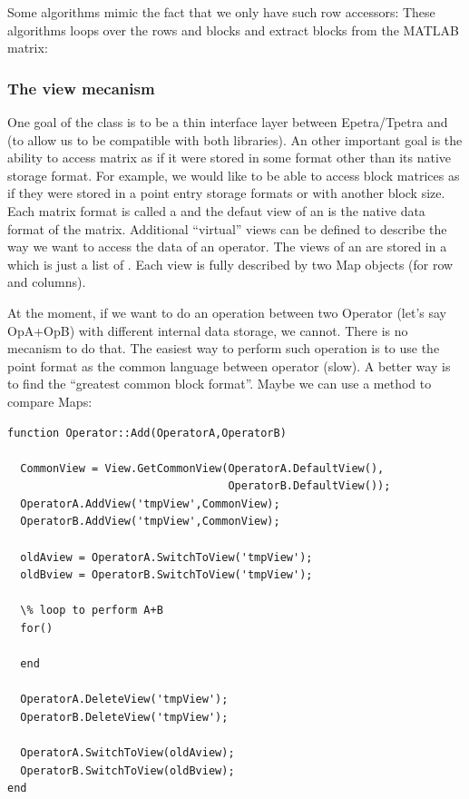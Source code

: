 Some \muemat algorithms mimic the fact that we only have such row accessors: These algorithms loops over the rows and blocks and extract blocks from the MATLAB matrix:

\subsubsection{The view mecanism}

One goal of the \Operator class is to be a thin interface layer between Epetra/Tpetra and \mloo (to allow us to be compatible with both libraries).
An other important goal is the ability to access matrix as if it were stored in some format other than its native storage format.
For example, we would like to be able to access block matrices as if they were stored in a point entry storage formats or with another block size. 
Each matrix format is called a \View and the defaut view of an \Operator is the native data format of the matrix. Additional ``virtual'' views can be defined to
describe the way we want to access the data of an operator.
The views of an \Operator are stored in a \ViewTable which is just a list of \View. Each view is fully described by two Map objects (for row and columns).

\begin{remark}
At the moment, if we want to do an operation between two Operator (let's say OpA+OpB) with different internal data storage, we cannot. There is no mecanism to do that.
The easiest way to perform such operation is to use the point format as the common language between operator (slow). A better way is to find the ``greatest common block format''.
Maybe we can use a method to compare Maps:
\begin{verbatim}
function Operator::Add(OperatorA,OperatorB)

  CommonView = View.GetCommonView(OperatorA.DefaultView(), 
                                  OperatorB.DefaultView());
  OperatorA.AddView('tmpView',CommonView);
  OperatorB.AddView('tmpView',CommonView);
  
  oldAview = OperatorA.SwitchToView('tmpView');
  oldBview = OperatorB.SwitchToView('tmpView');
  
  \% loop to perform A+B
  for() 

  end

  OperatorA.DeleteView('tmpView'); 
  OperatorB.DeleteView('tmpView'); 

  OperatorA.SwitchToView(oldAview);
  OperatorB.SwitchToView(oldBview);
end
\end{verbatim}
\end{remark}

